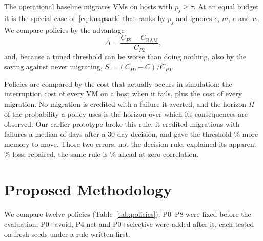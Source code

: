 \documentclass[pdflatex,sn-mathphys-num,iicol]{sn-jnl}
\theoremstyle{thmstyleone}%
\theoremstyle{thmstylethree}%
\begin{document}
The operational baseline migrates VMs on hosts with $p_j \ge \tau$. At an equal budget it is the
special case of~\eqref{eq:knapsack} that ranks by $p_j$ and ignores $c$, $m$, $e$ and $w$. We
compare policies by the advantage
\begin{equation}
\Delta = \frac{C_{P2} - C_{\mathrm{BAM}}}{C_{P2}},
\label{eq:delta}
\end{equation}
and, because a tuned threshold can be worse than doing nothing, also by the saving against never
migrating, $S = (C_{P0} - C)/C_{P0}$.

Policies are compared by the cost that actually occurs in simulation: the interruption cost of
every VM on a host when it fails, plus the cost of every migration. No migration is credited with
a failure it averted, and the horizon $H$ of the probability a policy uses is the horizon over
which its consequences are observed. Our earlier prototype broke this rule: it credited
migrations with failures a median of \VVOneMedianLeadDays{} days after a 30-day decision, and gave
the threshold \VVOneExtraGB\% more memory to move. Those two errors, not the decision rule,
explained its apparent \VVOneAdvRandom\% loss; repaired, the same rule is \VVOneAdvAligned\% ahead
at zero correlation.

\section{Proposed Methodology}\label{sec:method}

We compare twelve policies (Table~\ref{tab:policies}). P0--P8 were fixed before the evaluation;
P0+avoid, P4-net and P0+selective were added after it, each tested on fresh seeds under a rule
written first.
\end{document}
